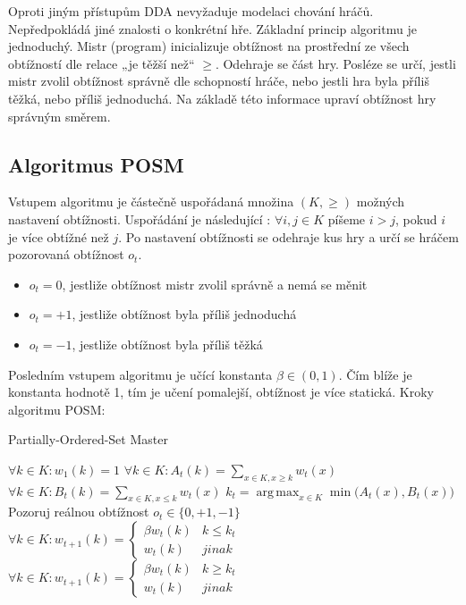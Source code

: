 Oproti jiným přístupům DDA nevyžaduje modelaci chování hráčů. Nepředpokládá jiné znalosti o konkrétní hře. 
Základní princip algoritmu je jednoduchý. Mistr (program) inicializuje obtížnost na prostřední ze všech obtížností dle relace „je těžší než“ $\geq$. Odehraje se část hry. Posléze se určí, jestli mistr zvolil obtížnost správně dle schopností hráče, nebo jestli hra byla příliš těžká, nebo příliš jednoduchá. Na základě této informace upraví obtížnost hry správným směrem.

\subsection{Algoritmus POSM}

Vstupem algoritmu je částečně uspořádaná množina $(K,\geq)$ možných nastavení obtížnosti. Uspořádání je následující : $\forall i,j \in K$ píšeme $i>j$, pokud $i$ je více obtížné než $j$.
Po nastavení obtížnosti se odehraje kus hry a určí se hráčem pozorovaná obtížnost $o_t$.

\begin{itemize}
	\item $o_t=0$, jestliže obtížnost mistr zvolil správně a nemá se měnit
	\item $o_t=+1$, jestliže obtížnost byla příliš jednoduchá
	\item $o_t=-1$, jestliže obtížnost byla příliš těžká
\end{itemize}
	
Posledním vstupem algoritmu je učící konstanta $\beta\in(0,1)$. Čím blíže je konstanta hodnotě 1, tím je učení pomalejší, obtížnost je více statická.
Kroky algoritmu POSM:

\begin{algorithm}
\caption{Partially-Ordered-Set Master}
\label{posm}
\begin{algorithmic}[1]
\State $\forall k \in K : w_1(k) = 1$
	 \State $\forall k \in K : A_t(k) = \sum_{x \in K, x \geq k} w_t(x)$
	 \State $\forall k \in K : B_t(k) = \sum_{x \in K, x \leq k} w_t(x)$
	 \State $k_t = \operatorname{arg\,max}_{x \in K} \min({A_t(x), B_t(x))}$
	 \State Pozoruj reálnou obtížnost $o_t\in \{0,+1,-1\}$
	   \State $\forall k \in K : w_{t+1}(k) = 
		                                        \begin{cases}
																						   \beta w_t(k) & k \leq k_t \\
																							 w_t(k) & jinak
																						\end{cases}
						 $
   \EndIf
	   \State $\forall k \in K : w_{t+1}(k) = 
		                                        \begin{cases}
																						   \beta w_t(k) & k \geq k_t \\
																							 w_t(k) & jinak
																						\end{cases}
						 $
   \EndIf
\EndFor
\end{algorithmic}
\end{algorithm}

